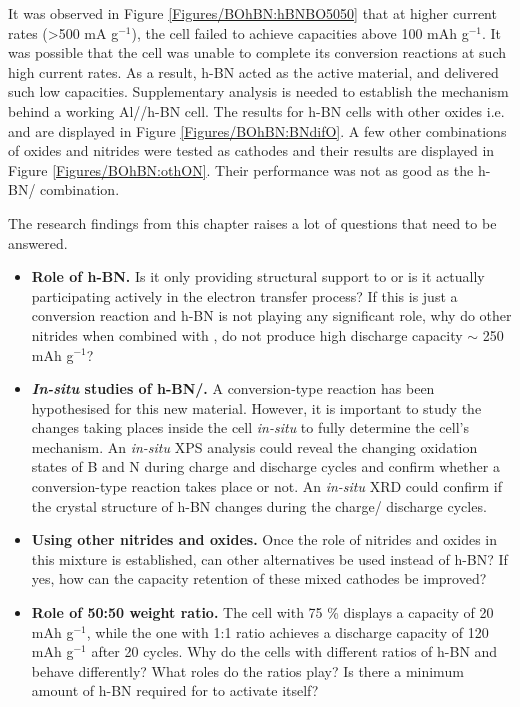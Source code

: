 It was observed in Figure \ref{Figures/BOhBN:hBNBO5050} that at higher current rates (>500 mA g$^{-1}$), the cell failed to achieve capacities above 100 mAh g$^{-1}$. It was possible that the cell was unable to complete its conversion reactions at such high current rates. As a result, h-BN acted as the active material, and delivered such low capacities. Supplementary analysis is needed to establish the mechanism behind a working Al//h-BN cell. The results for h-BN cells with other oxides i.e.  and  are displayed in Figure \ref{Figures/BOhBN:BNdifO}. A few other combinations of oxides and nitrides were tested as cathodes and their results are displayed in Figure \ref{Figures/BOhBN:othON}. Their performance was not as good as the h-BN/  combination.
 
The research findings from this chapter raises a lot of questions that need to be answered.
\begin{itemize}
    \item \textbf{Role of h-BN.} Is it only providing structural support to  or is it actually participating actively in the electron transfer process? If this is just a conversion reaction and h-BN is not playing any significant role, why do other nitrides when combined with , do not produce high discharge capacity $\sim$ 250 mAh g$^{-1}$?
    \item \textbf{\textit{In-situ} studies of h-BN/.} A conversion-type reaction has been hypothesised for this new material. However, it is important to study the changes taking places inside the cell \textit{in-situ} to fully determine the cell's mechanism. An \textit{in-situ} XPS analysis could reveal the changing oxidation states of B and N during charge and discharge cycles and confirm whether a conversion-type reaction takes place or not. An \textit{in-situ} XRD could confirm if the crystal structure of h-BN changes during the charge/ discharge cycles. 
    \item \textbf{Using other nitrides and oxides.} Once the role of nitrides and oxides in this mixture is established, can other alternatives be used instead of h-BN? If yes, how can the capacity retention of these mixed cathodes be improved? 
    \item \textbf{Role of 50:50 weight ratio.} The cell with 75 \%  displays a capacity of 20 mAh g$^{-1}$, while the one with 1:1 ratio achieves a discharge capacity of 120 mAh g$^{-1}$ after 20 cycles. Why do the cells with different ratios of h-BN and  behave differently? What roles do the ratios play? Is there a minimum amount of h-BN required for  to activate itself?  
\end{itemize}
